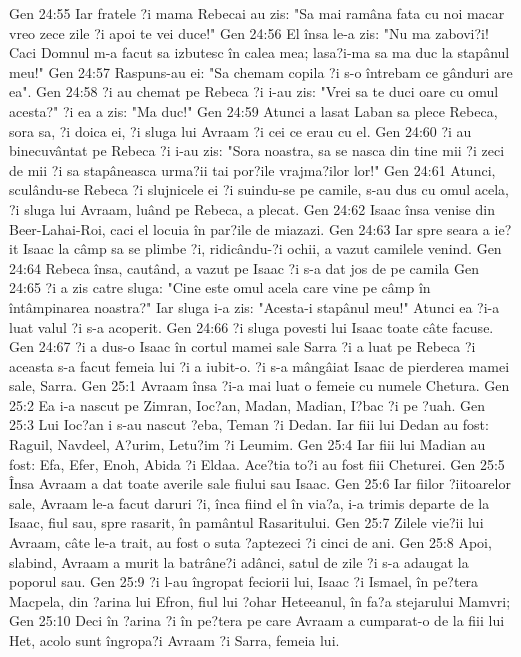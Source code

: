 Gen 24:55  Iar fratele ?i mama Rebecai au zis: "Sa mai ramâna fata cu noi macar vreo zece zile ?i apoi te vei duce!"
Gen 24:56  El însa le-a zis: "Nu ma zabovi?i! Caci Domnul m-a facut sa izbutesc în calea mea; lasa?i-ma sa ma duc la stapânul meu!"
Gen 24:57  Raspuns-au ei: "Sa chemam copila ?i s-o întrebam ce gânduri are ea".
Gen 24:58  ?i au chemat pe Rebeca ?i i-au zis: "Vrei sa te duci oare cu omul acesta?" ?i ea a zis: "Ma duc!"
Gen 24:59  Atunci a lasat Laban sa plece Rebeca, sora sa, ?i doica ei, ?i sluga lui Avraam ?i cei ce erau cu el.
Gen 24:60  ?i au binecuvântat pe Rebeca ?i i-au zis: "Sora noastra, sa se nasca din tine mii ?i zeci de mii ?i sa stapâneasca urma?ii tai por?ile vrajma?ilor lor!"
Gen 24:61  Atunci, sculându-se Rebeca ?i slujnicele ei ?i suindu-se pe camile, s-au dus cu omul acela, ?i sluga lui Avraam, luând pe Rebeca, a plecat.
Gen 24:62  Isaac însa venise din Beer-Lahai-Roi, caci el locuia în par?ile de miazazi.
Gen 24:63  Iar spre seara a ie?it Isaac la câmp sa se plimbe ?i, ridicându-?i ochii, a vazut camilele venind.
Gen 24:64  Rebeca însa, cautând, a vazut pe Isaac ?i s-a dat jos de pe camila
Gen 24:65  ?i a zis catre sluga: "Cine este omul acela care vine pe câmp în întâmpinarea noastra?" Iar sluga i-a zis: "Acesta-i stapânul meu!" Atunci ea ?i-a luat valul ?i s-a acoperit.
Gen 24:66  ?i sluga povesti lui Isaac toate câte facuse.
Gen 24:67  ?i a dus-o Isaac în cortul mamei sale Sarra ?i a luat pe Rebeca ?i aceasta s-a facut femeia lui ?i a iubit-o. ?i s-a mângâiat Isaac de pierderea mamei sale, Sarra.
Gen 25:1  Avraam însa ?i-a mai luat o femeie cu numele Chetura.
Gen 25:2  Ea i-a nascut pe Zimran, Ioc?an, Madan, Madian, I?bac ?i pe ?uah.
Gen 25:3  Lui Ioc?an i s-au nascut ?eba, Teman ?i Dedan. Iar fiii lui Dedan au fost: Raguil, Navdeel, A?urim, Letu?im ?i Leumim.
Gen 25:4  Iar fiii lui Madian au fost: Efa, Efer, Enoh, Abida ?i Eldaa. Ace?tia to?i au fost fiii Cheturei.
Gen 25:5  Însa Avraam a dat toate averile sale fiului sau Isaac.
Gen 25:6  Iar fiilor ?iitoarelor sale, Avraam le-a facut daruri ?i, înca fiind el în via?a, i-a trimis departe de la Isaac, fiul sau, spre rasarit, în pamântul Rasaritului.
Gen 25:7  Zilele vie?ii lui Avraam, câte le-a trait, au fost o suta ?aptezeci ?i cinci de ani.
Gen 25:8  Apoi, slabind, Avraam a murit la batrâne?i adânci, satul de zile ?i s-a adaugat la poporul sau.
Gen 25:9  ?i l-au îngropat feciorii lui, Isaac ?i Ismael, în pe?tera Macpela, din ?arina lui Efron, fiul lui ?ohar Heteeanul, în fa?a stejarului Mamvri;
Gen 25:10  Deci în ?arina ?i în pe?tera pe care Avraam a cumparat-o de la fiii lui Het, acolo sunt îngropa?i Avraam ?i Sarra, femeia lui.
